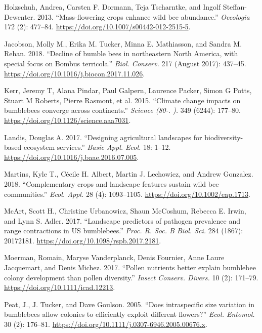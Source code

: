 \documentclass[11pt,]{article}
\begin{document}
\leavevmode\hypertarget{ref-Holzschuh2013}{}%
Holzschuh, Andrea, Carsten F. Dormann, Teja Tscharntke, and Ingolf
Steffan-Dewenter. 2013. ``Mass-flowering crops enhance wild bee
abundance.'' \emph{Oecologia} 172 (2): 477--84.
\url{https://doi.org/10.1007/s00442-012-2515-5}.

\leavevmode\hypertarget{ref-Jacobson2018a}{}%
Jacobson, Molly M., Erika M. Tucker, Minna E. Mathiasson, and Sandra M.
Rehan. 2018. ``Decline of bumble bees in northeastern North America,
with special focus on Bombus terricola.'' \emph{Biol. Conserv.} 217
(August 2017): 437--45.
\url{https://doi.org/10.1016/j.biocon.2017.11.026}.

\leavevmode\hypertarget{ref-Kerr2015}{}%
Kerr, Jeremy T, Alana Pindar, Paul Galpern, Laurence Packer, Simon G
Potts, Stuart M Roberts, Pierre Rasmont, et al. 2015. ``Climate change
impacts on bumblebees converge across continents.'' \emph{Science (80-.
).} 349 (6244): 177--80. \url{https://doi.org/10.1126/science.aaa7031}.

\leavevmode\hypertarget{ref-Landis2017}{}%
Landis, Douglas A. 2017. ``Designing agricultural landscapes for
biodiversity-based ecosystem services.'' \emph{Basic Appl. Ecol.} 18:
1--12. \url{https://doi.org/10.1016/j.baae.2016.07.005}.

\leavevmode\hypertarget{ref-Martins2018}{}%
Martins, Kyle T., Cécile H. Albert, Martin J. Lechowicz, and Andrew
Gonzalez. 2018. ``Complementary crops and landscape features sustain
wild bee communities.'' \emph{Ecol. Appl.} 28 (4): 1093--1105.
\url{https://doi.org/10.1002/eap.1713}.

\leavevmode\hypertarget{ref-McArt2017}{}%
McArt, Scott H., Christine Urbanowicz, Shaun McCoshum, Rebecca E. Irwin,
and Lynn S. Adler. 2017. ``Landscape predictors of pathogen prevalence
and range contractions in US bumblebees.'' \emph{Proc. R. Soc. B Biol.
Sci.} 284 (1867): 20172181.
\url{https://doi.org/10.1098/rspb.2017.2181}.

\leavevmode\hypertarget{ref-Moerman2017}{}%
Moerman, Romain, Maryse Vanderplanck, Denis Fournier, Anne Laure
Jacquemart, and Denis Michez. 2017. ``Pollen nutrients better explain
bumblebee colony development than pollen diversity.'' \emph{Insect
Conserv. Divers.} 10 (2): 171--79.
\url{https://doi.org/10.1111/icad.12213}.

\leavevmode\hypertarget{ref-Peat2005}{}%
Peat, J., J. Tucker, and Dave Goulson. 2005. ``Does intraspecific size
variation in bumblebees allow colonies to efficiently exploit different
flowers?'' \emph{Ecol. Entomol.} 30 (2): 176--81.
\url{https://doi.org/10.1111/j.0307-6946.2005.00676.x}.
\end{document}
